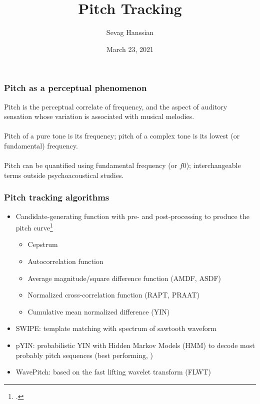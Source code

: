 \documentclass{beamer}
\title{Pitch Tracking}
\author{Sevag Hanssian}
\date{March 23, 2021}
\institute{MUMT 621, Winter 2021}
\begin{document}
\begin{frame}
\maketitle
\end{frame}

\begin{frame}
	\frametitle{Pitch as a perceptual phenomenon}
	Pitch is the perceptual correlate of frequency, and the aspect of auditory sensation whose variation is associated with musical melodies.\\\ \\
	Pitch of a pure tone is its frequency; pitch of a complex tone is its lowest (or fundamental) frequency.\\\ \\
	Pitch can be quantified using fundamental frequency (or $\mathit{f0}$); interchangeable terms outside psychoacoustical studies.
\end{frame}


\begin{frame}
	\frametitle{Pitch tracking algorithms}
	\begin{itemize}
		\item
			Candidate-generating function with pre- and post-processing to produce the pitch curve\footcite{crepe}
		\begin{itemize}
			\item
				Cepstrum 
			\item
				Autocorrelation function
			\item
				Average magnitude/square difference function (AMDF, ASDF)
			\item
				Normalized cross-correlation function (RAPT, PRAAT)
			\item
				Cumulative mean normalized difference (YIN)
		\end{itemize}
	\item
		SWIPE: template matching with spectrum of sawtooth waveform
	\item
		pYIN: probabilistic YIN with Hidden Markov Models (HMM) to decode most probably pitch sequences (best performing, )
	\item
		WavePitch: based on the fast lifting wavelet transform (FLWT)
	\end{itemize}
\end{frame}
\end{document}
